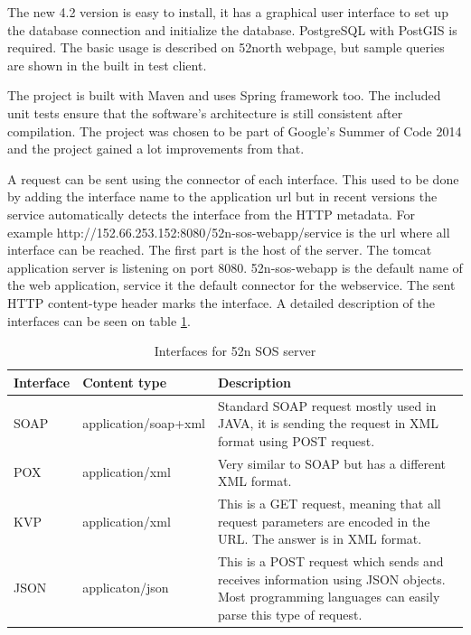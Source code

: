 The new 4.2 version is easy to install, it has a graphical user interface to set up the database connection and initialize the database. PostgreSQL with PostGIS is required.  The basic usage is described on  52north webpage, but sample queries are shown in the built in test client. 

The project is built with Maven and uses Spring framework too. The included unit tests ensure that the software's architecture is still consistent after compilation. The project was chosen to be part of Google's Summer of Code 2014 and the project gained a lot improvements from that. 

A request can be sent using the connector of each interface. This used to be done by adding the interface name to the application url but in recent versions the service automatically detects the interface from the HTTP metadata. For example http://152.66.253.152:8080/52n-sos-webapp/service is the url where all interface can be reached. The first part is the host of the server. The tomcat application server is listening on port 8080. 52n-sos-webapp is the default name of the web application, service it the default connector for the webservice. The sent HTTP content-type header marks the interface. A detailed description of the interfaces can be seen on table \ref{tab:services}.
\begin{table}[h]
\begin{center}
\begin{tabular}{| l | l | p{8cm} |}
\hline
Interface  & Content type & Description \\ \hline \hline
SOAP & application/soap+xml & Standard SOAP request mostly used in JAVA, it is sending the request in XML format using POST request. \\ \hline
POX & application/xml & Very similar to SOAP but has a different XML format. \\ \hline
KVP & application/xml & This is a GET request, meaning that all request parameters are encoded in the URL. The answer is in XML format. \\ \hline
JSON & applicaton/json & This is a POST request which sends and receives information using JSON objects. Most programming languages can easily parse this type of request.\\ \hline
\end{tabular}
\caption{Interfaces for 52n SOS server\label{tab:services}}
\end{center}
\end{table}



